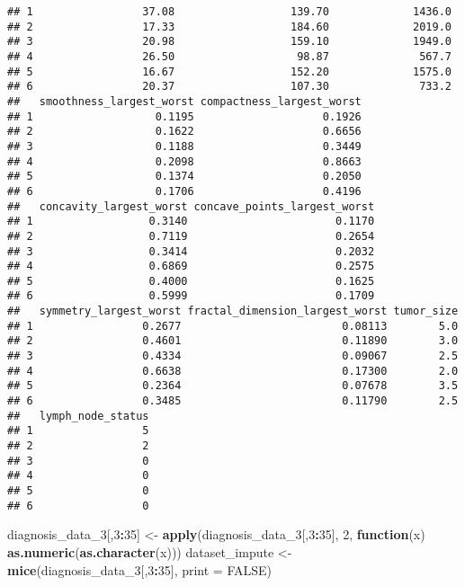 \documentclass[]{article}
\newenvironment{Shaded}{\begin{snugshade}}{\end{snugshade}}
\newcommand{\KeywordTok}[1]{\textcolor[rgb]{0.13,0.29,0.53}{\textbf{#1}}}
\newcommand{\DataTypeTok}[1]{\textcolor[rgb]{0.13,0.29,0.53}{#1}}
\newcommand{\DecValTok}[1]{\textcolor[rgb]{0.00,0.00,0.81}{#1}}
\newcommand{\StringTok}[1]{\textcolor[rgb]{0.31,0.60,0.02}{#1}}
\newcommand{\OtherTok}[1]{\textcolor[rgb]{0.56,0.35,0.01}{#1}}
\newcommand{\ControlFlowTok}[1]{\textcolor[rgb]{0.13,0.29,0.53}{\textbf{#1}}}
\newcommand{\OperatorTok}[1]{\textcolor[rgb]{0.81,0.36,0.00}{\textbf{#1}}}
\newcommand{\NormalTok}[1]{#1}
\begin{document}
\begin{verbatim}
## 1                 37.08                  139.70             1436.0
## 2                 17.33                  184.60             2019.0
## 3                 20.98                  159.10             1949.0
## 4                 26.50                   98.87              567.7
## 5                 16.67                  152.20             1575.0
## 6                 20.37                  107.30              733.2
##   smoothness_largest_worst compactness_largest_worst
## 1                   0.1195                    0.1926
## 2                   0.1622                    0.6656
## 3                   0.1188                    0.3449
## 4                   0.2098                    0.8663
## 5                   0.1374                    0.2050
## 6                   0.1706                    0.4196
##   concavity_largest_worst concave_points_largest_worst
## 1                  0.3140                       0.1170
## 2                  0.7119                       0.2654
## 3                  0.3414                       0.2032
## 4                  0.6869                       0.2575
## 5                  0.4000                       0.1625
## 6                  0.5999                       0.1709
##   symmetry_largest_worst fractal_dimension_largest_worst tumor_size
## 1                 0.2677                         0.08113        5.0
## 2                 0.4601                         0.11890        3.0
## 3                 0.4334                         0.09067        2.5
## 4                 0.6638                         0.17300        2.0
## 5                 0.2364                         0.07678        3.5
## 6                 0.3485                         0.11790        2.5
##   lymph_node_status
## 1                 5
## 2                 2
## 3                 0
## 4                 0
## 5                 0
## 6                 0
\end{verbatim}

\begin{Shaded}
\begin{Highlighting}[]
\NormalTok{diagnosis_data_}\DecValTok{3}\NormalTok{[,}\DecValTok{3}\OperatorTok{:}\DecValTok{35}\NormalTok{] <-}\StringTok{ }\KeywordTok{apply}\NormalTok{(diagnosis_data_}\DecValTok{3}\NormalTok{[,}\DecValTok{3}\OperatorTok{:}\DecValTok{35}\NormalTok{], }\DecValTok{2}\NormalTok{, }\ControlFlowTok{function}\NormalTok{(x) }\KeywordTok{as.numeric}\NormalTok{(}\KeywordTok{as.character}\NormalTok{(x)))}
\NormalTok{dataset_impute <-}\StringTok{ }\KeywordTok{mice}\NormalTok{(diagnosis_data_}\DecValTok{3}\NormalTok{[,}\DecValTok{3}\OperatorTok{:}\DecValTok{35}\NormalTok{],  }\DataTypeTok{print =} \OtherTok{FALSE}\NormalTok{)}
\end{Highlighting}
\end{Shaded}
\end{document}
